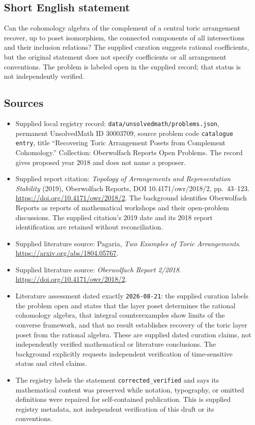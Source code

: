\documentclass[11pt]{article}
\begin{document}
\subsection{Short English statement}
Can the cohomology algebra of the complement of a central toric arrangement recover, up to poset isomorphism, the connected components of all intersections and their inclusion relations? The supplied curation suggests rational coefficients, but the original statement does not specify coefficients or all arrangement conventions. The problem is labeled open in the supplied record; that status is not independently verified.
\subsection{Sources}
\begin{itemize}
\item Supplied local registry record: \texttt{data/unsolvedmath/problems.json}, permanent UnsolvedMath ID \(30003709\), source problem code \texttt{catalogue entry}, title ``Recovering Toric Arrangement Posets from Complement Cohomology.'' Collection: Oberwolfach Reports Open Problems. The record gives proposed year \(2018\) and does not name a proposer.
\item Supplied report citation: \emph{Topology of Arrangements and Representation Stability} (2019), Oberwolfach Reports, DOI 10.4171/owr/2018/2, pp.\ 43--123. \url{https://doi.org/10.4171/owr/2018/2}. The background identifies Oberwolfach Reports as reports of mathematical workshops and their open-problem discussions. The supplied citation's 2019 date and its 2018 report identification are retained without reconciliation.
\item Supplied literature source: Pagaria, \emph{Two Examples of Toric Arrangements}. \url{https://arxiv.org/abs/1804.05767}.
\item Supplied literature source: \emph{Oberwolfach Report 2/2018}. \url{https://doi.org/10.4171/owr/2018/2}.
\item Literature assessment dated exactly \texttt{2026-08-21}: the supplied curation labels the problem open and states that the layer poset determines the rational cohomology algebra, that integral counterexamples show limits of the converse framework, and that no result establishes recovery of the toric layer poset from the rational algebra. These are supplied dated curation claims, not independently verified mathematical or literature conclusions. The background explicitly requests independent verification of time-sensitive status and cited claims.
\item The registry labels the statement \texttt{corrected\_verified} and says its mathematical content was preserved while notation, typography, or omitted definitions were repaired for self-contained publication. This is supplied registry metadata, not independent verification of this draft or its conventions.
\end{itemize}
\end{document}
